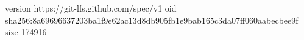 version https://git-lfs.github.com/spec/v1
oid sha256:8a69696637203ba1f9e62ac13d8db905fb1e9bab165c3da07ff060aabecbee9f
size 174916
